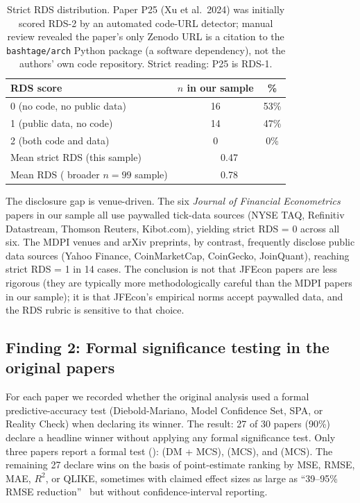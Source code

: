 \begin{table}[H]
\centering
\caption{Strict RDS distribution. Paper P25 (Xu et al.\ 2024) was initially scored RDS-2 by an automated code-URL detector; manual review revealed the paper's only Zenodo URL is a citation to the \texttt{bashtage/arch} Python package (a software dependency), not the authors' own code repository. Strict reading: P25 is RDS-1.}\label{tab:phase2_rds}
\begin{tabular}{lcc}
\toprule
RDS score & $n$ in our sample & \% \\
\midrule
0 (no code, no public data) & 16 & 53\% \\
1 (public data, no code) & 14 & 47\% \\
2 (both code and data) & 0 & 0\% \\
\midrule
Mean strict RDS (this sample) & \multicolumn{2}{c}{0.47} \\
Mean RDS (\citet{Khan2026Survey} broader $n=99$ sample) & \multicolumn{2}{c}{0.78} \\
\bottomrule
\end{tabular}
\end{table}

The disclosure gap is venue-driven. The six \emph{Journal of Financial Econometrics} papers in our sample all use paywalled tick-data sources (NYSE TAQ, Refinitiv Datastream, Thomson Reuters, Kibot.com), yielding strict RDS = 0 across all six. The MDPI venues and arXiv preprints, by contrast, frequently disclose public data sources (Yahoo Finance, CoinMarketCap, CoinGecko, JoinQuant), reaching strict RDS = 1 in 14 cases. The conclusion is not that JFEcon papers are less rigorous (they are typically more methodologically careful than the MDPI papers in our sample); it is that JFEcon's empirical norms accept paywalled data, and the RDS rubric is sensitive to that choice.

\subsection{Finding 2: Formal significance testing in the original papers}\label{sec:phase2_sigtest}

For each paper we recorded whether the original analysis used a formal predictive-accuracy test (Diebold-Mariano, Model Confidence Set, SPA, or Reality Check) when declaring its winner. The result: 27 of 30 papers (90\%) declare a headline winner without applying any formal significance test. Only three papers report a formal test (): \citet{ChristensenSiggaardVeliyev2023} (DM + MCS), \citet{Bucci2020} (MCS), and \citet{ZhuoMorimoto2024} (MCS). The remaining 27 declare wins on the basis of point-estimate ranking by MSE, RMSE, MAE, $R^2$, or QLIKE, sometimes with claimed effect sizes as large as ``39--95\% RMSE reduction''~\citep{ErsinBildirici2023} but without confidence-interval reporting.


